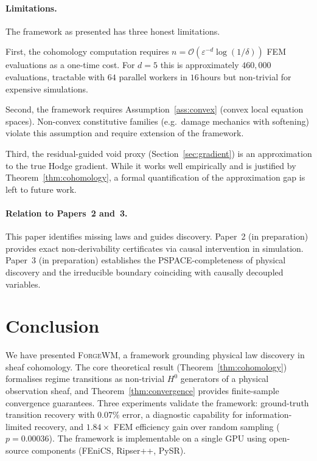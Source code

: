 \documentclass[twoside,11pt]{article}
\newcommand{\ForgeWM}{\textsc{ForgeWM}\xspace}
\begin{document}
\paragraph{Limitations.}
The framework as presented has three honest limitations.

First, the cohomology computation requires
$n = \mathcal{O}(\varepsilon^{-d}\log(1/\delta))$ FEM evaluations
as a one-time cost. For $d = 5$ this is approximately $460{,}000$
evaluations, tractable with $64$ parallel workers in $16$\,hours but
non-trivial for expensive simulations.

Second, the framework requires Assumption~\ref{ass:convex}
(convex local equation spaces). Non-convex constitutive families
(e.g.\ damage mechanics with softening) violate this assumption and
require extension of the framework.

Third, the residual-guided void proxy (Section~\ref{sec:gradient})
is an approximation to the true Hodge gradient. While it works well
empirically and is justified by Theorem~\ref{thm:cohomology}, a
formal quantification of the approximation gap is left to future work.

\paragraph{Relation to Papers~2 and~3.}
This paper identifies missing laws and guides discovery. Paper~2
(in preparation) provides exact non-derivability certificates via
causal intervention in simulation. Paper~3 (in preparation)
establishes the PSPACE-completeness of physical discovery and the
irreducible boundary coinciding with causally decoupled variables.

\section{Conclusion}
\label{sec:conclusion}

We have presented \ForgeWM, a framework grounding physical law
discovery in sheaf cohomology. The core theoretical result
(Theorem~\ref{thm:cohomology}) formalises regime transitions as
non-trivial $H^0$ generators of a physical observation sheaf, and
Theorem~\ref{thm:convergence} provides finite-sample convergence
guarantees. Three experiments validate the framework: ground-truth
transition recovery with $0.07\%$ error, a diagnostic capability for
information-limited recovery, and $1.84\times$ FEM efficiency gain
over random sampling ($p = 0.00036$). The framework is implementable
on a single GPU using open-source components
(FEniCS, Ripser++, PySR).



\end{document}
